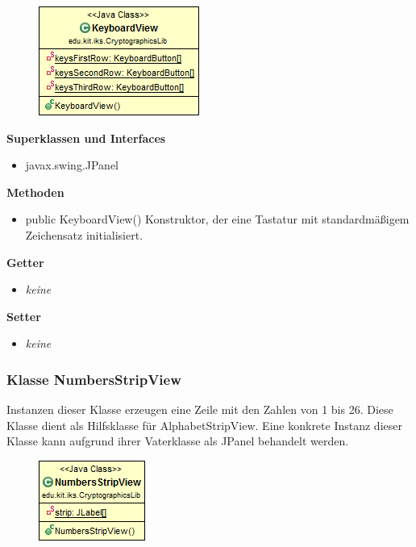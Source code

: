 \documentclass{article}
\begin{document}
      \begin{figure}[H]
        \centering
        \includegraphics{resources/edu-kit-iks-CryptographicsLib-KeyboardView}
      \end{figure}
	
      \textbf{Superklassen und Interfaces}
      \begin{itemize}
        \item javax.swing.JPanel
      \end{itemize}
	
      \textbf{Methoden}
      \begin{itemize}
        \item public KeyboardView()
          Konstruktor, der eine Tastatur mit standardmäßigem Zeichensatz initialisiert.
      \end{itemize}
      
      \textbf{Getter}
      \begin{itemize}
		\item \textit{keine}
      \end{itemize}
      
      \textbf{Setter}
      \begin{itemize}
        \item \textit{keine}
      \end{itemize}
	
	\subsubsection{Klasse NumbersStripView}
	  Instanzen dieser Klasse erzeugen eine Zeile mit den Zahlen von 1 bis 26.
	  Diese Klasse dient als Hilfsklasse für AlphabetStripView.
	  Eine konkrete Instanz dieser Klasse kann aufgrund ihrer Vaterklasse als JPanel behandelt werden.
	
      \begin{figure}[H]
        \centering
        \includegraphics{resources/edu-kit-iks-CryptographicsLib-NumbersStripView}
      \end{figure}
	
\end{document}
